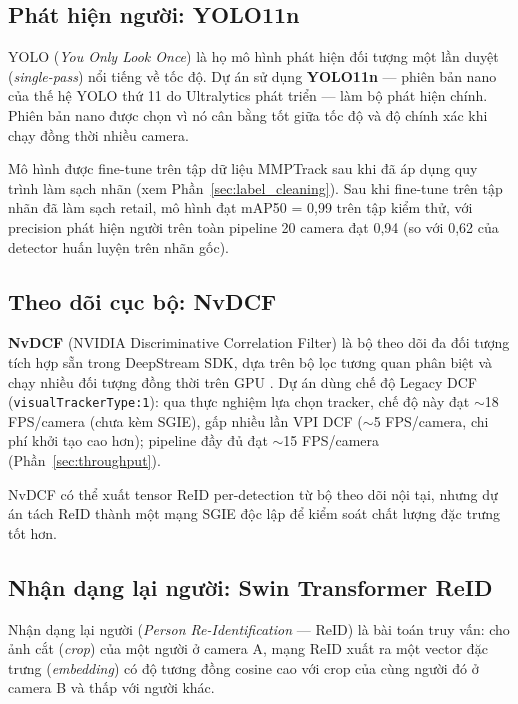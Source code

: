 \documentclass{article} %
\begin{document}
\subsection{Phát hiện người: YOLO11n}

YOLO (\textit{You Only Look Once}) là họ mô hình phát hiện đối tượng một lần duyệt (\textit{single-pass}) nổi tiếng về tốc độ. Dự án sử dụng \textbf{YOLO11n} --- phiên bản nano của thế hệ YOLO thứ 11 do Ultralytics phát triển --- làm bộ phát hiện chính. Phiên bản nano được chọn vì nó cân bằng tốt giữa tốc độ và độ chính xác khi chạy đồng thời nhiều camera.

Mô hình được fine-tune trên tập dữ liệu MMPTrack sau khi đã áp dụng quy trình làm sạch nhãn (xem Phần~\ref{sec:label_cleaning}). Sau khi fine-tune trên tập nhãn đã làm sạch retail, mô hình đạt mAP50 = 0{,}99 trên tập kiểm thử, với precision phát hiện người trên toàn pipeline 20 camera đạt 0{,}94 (so với 0{,}62 của detector huấn luyện trên nhãn gốc).

\subsection{Theo dõi cục bộ: NvDCF}

\textbf{NvDCF} (NVIDIA Discriminative Correlation Filter) là bộ theo dõi đa đối tượng tích hợp sẵn trong DeepStream SDK, dựa trên bộ lọc tương quan phân biệt và chạy nhiều đối tượng đồng thời trên GPU \cite{NVIDIA2022}. Dự án dùng chế độ Legacy DCF (\texttt{visualTrackerType:1}): qua thực nghiệm lựa chọn tracker, chế độ này đạt $\sim$18 FPS/camera (chưa kèm SGIE), gấp nhiều lần VPI DCF ($\sim$5 FPS/camera, chi phí khởi tạo cao hơn); pipeline đầy đủ đạt $\sim$15 FPS/camera (Phần~\ref{sec:throughput}).

NvDCF có thể xuất tensor ReID per-detection từ bộ theo dõi nội tại, nhưng dự án tách ReID thành một mạng SGIE độc lập để kiểm soát chất lượng đặc trưng tốt hơn.

\subsection{Nhận dạng lại người: Swin Transformer ReID}

Nhận dạng lại người (\textit{Person Re-Identification} --- ReID) là bài toán truy vấn: cho ảnh cắt (\textit{crop}) của một người ở camera A, mạng ReID xuất ra một vector đặc trưng (\textit{embedding}) có độ tương đồng cosine cao với crop của cùng người đó ở camera B và thấp với người khác.
\end{document}
